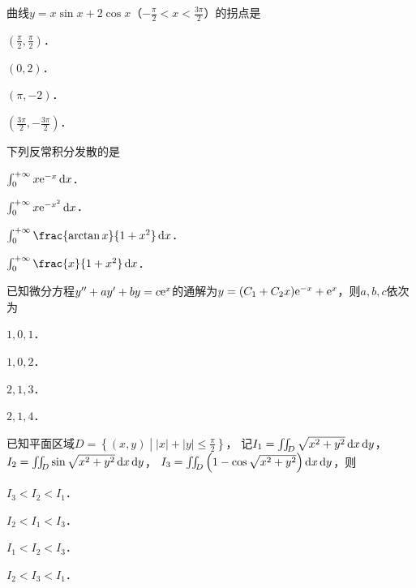 \documentclass[plain,noanswer,medmath]{../../template/jnuexam}
\begin{document}








\begin{problem}
曲线$y = x\sin x + 2\cos x$（$- \frac{\pi}{2} < x < \frac{3\pi}{2}$）的拐点是\pickout{}
\begin{abcd}
\item $\left(\frac{\pi}{2},\frac{\pi}{2} \right)$．
\item $(0,2)$．
\item $(\pi , - 2)$．
\item $\left(\frac{3\pi}{2}, - \frac{3\pi}{2} \right)$．
\end{abcd}
\end{problem}


\begin{problem}
下列反常积分发散的是\pickout{}
\begin{abcd}
\item $\int_0^{+\infty} x\mathrm{e}^{- x} \mathop{}\!\mathrm{d} x$．
\item $\int_0^{+\infty} x\mathrm{e}^{- x^2} \mathop{}\!\mathrm{d} x$．
\item $\int_0^{+\infty} \frac{\arctan x}{1 + x^2}\dx$．
\item $\int_0^{+\infty} \frac{x}{1 + x^2}\dx$．
\end{abcd}
\end{problem}


\begin{problem}
已知微分方程$y'' + ay' + by = c\mathrm{e}^x$的通解为$y = (C_1 + C_2 x) \mathrm{e}^{- x} + \mathrm{e}^x$，则$a,b,c$依次为\pickout{}
\begin{abcd}
\item $1,0,1$．
\item $1,0,2$．
\item $2,1,3$．
\item $2,1,4$．
\end{abcd}
\end{problem}


\begin{problem}
已知平面区域$D = \left\{(x,y)\middle||x| + |y| \le \frac{\pi}{2} \right\}$，
记$I_1 = \iint_D \sqrt{x^2 + y^2} \mathop{}\!\mathrm{d} x\mathop{}\!\mathrm{d} y$，\goodbreak $I_2 = \iint_D \sin \sqrt{x^2 + y^2} \mathop{}\!\mathrm{d} x\mathop{}\!\mathrm{d} y$，
$I_3 = \iint_D \left(1 - \cos \sqrt{x^2 + y^2} \right) \mathop{}\!\mathrm{d} x\mathop{}\!\mathrm{d} y$，则\pickout{}
\begin{abcd}
\item $I_3 < I_2 < I_1$．
\item $I_2 < I_1 < I_3$．
\item $I_1 < I_2 < I_3$．
\item $I_2 < I_3 < I_1$．
\end{abcd}
\end{problem}
\end{document}
